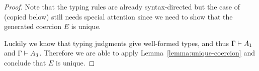 \begin{proof}
  Note that the typing rules are already syntax-directed but the case of
   (copied below) still needs special attention since we
  need to show that the generated coercion $E$ is unique.
  \begin{mathpar}
  \end{mathpar}
  Luckily we know that typing
  judgments give well-formed types, and thus $\jwf \Gamma {A_1}$ and $\jwf
  \Gamma {A_3}$. Therefore we are able to apply
  Lemma~\ref{lemma:unique-coercion} and conclude that $E$ is unique.

\end{proof}
